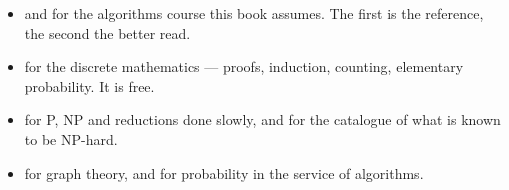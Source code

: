 \begin{itemize}[leftmargin=*]
  \item \citet{CLRS2022} and \citet{KleinbergTardos2005} for the algorithms
        course this book assumes. The first is the reference, the second the
        better read.
  \item \citet{LehmanLeightonMeyer2018} for the discrete mathematics ---
        proofs, induction, counting, elementary probability. It is free.
  \item \citet{Sipser2013} for \textrm{P}, \textrm{NP} and reductions done
        slowly, and \citet{GareyJohnson1979} for the catalogue of what is known
        to be \textrm{NP}-hard.
  \item \citet{Diestel2017} for graph theory, and \citet{MitzenmacherUpfal2017}
        for probability in the service of algorithms.
\end{itemize}
